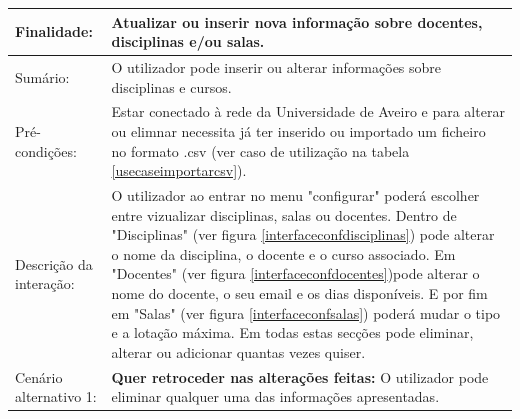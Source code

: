 \documentclass[11pt, twoside]{report}
\begin{document}
\begin{table}[H]
\begin{center}
\begin{tabularx}{\textwidth}{|l|X|}
				\hline
				Finalidade:                 & Atualizar ou inserir nova informação sobre docentes, disciplinas e/ou salas.                                                                                                                                                                                                                                                                                                                                                                                                                                                                                          \\
				\hline
				Sumário:                   & O utilizador pode inserir ou alterar informações sobre disciplinas e cursos.                                                                                                                                                                                                                                                                                                                                                                                                                                                                                          \\
				\hline
				Pré-condições:           & Estar conectado à rede da Universidade de Aveiro e para alterar ou elimnar necessita já ter inserido ou importado um ficheiro no formato .csv (ver caso de utilização na tabela \ref{usecaseimportarcsv}).                                                                                                                                                                                                                                                                                                                                                          \\
				\hline
				Descrição da interação: & O utilizador ao entrar no menu "configurar" poderá escolher entre vizualizar disciplinas, salas ou docentes. Dentro de "Disciplinas" (ver figura \ref{interfaceconfdisciplinas}) pode alterar o nome da disciplina, o docente e o curso associado. Em "Docentes" (ver figura \ref{interfaceconfdocentes})pode alterar o nome do docente, o seu email e os dias disponíveis. E por fim em "Salas" (ver figura \ref{interfaceconfsalas}) poderá mudar o tipo e a lotação máxima. Em todas estas secções pode eliminar, alterar ou adicionar quantas vezes quiser. \\
				\hline
				Cenário alternativo 1:     & \textbf{Quer retroceder nas alterações feitas:} O utilizador pode eliminar qualquer uma das informações apresentadas.                                                                                                                                                                                                                                                                                                                                                                                                                                               \\

\end{tabularx}
\end{center}
\end{table}
\end{document}
